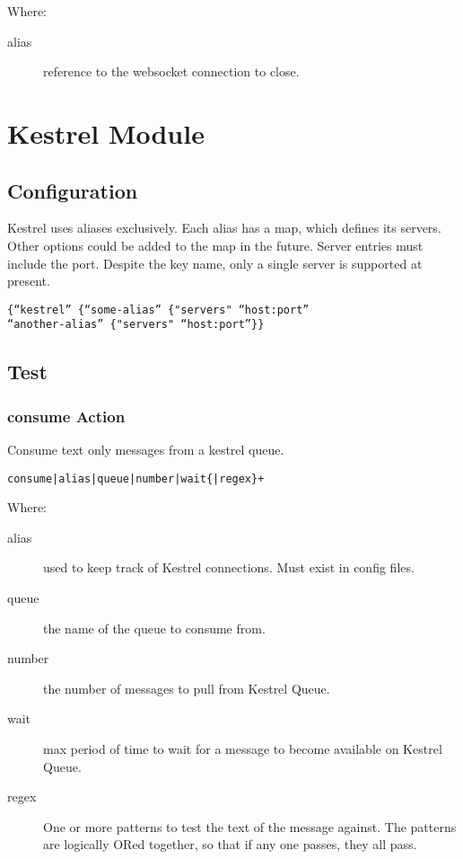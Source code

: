 \documentclass[12pt,a4paper,koma]{article}
\begin{document}
Where:
\begin{description}
\item[{alias}] reference to the websocket connection to close.
\end{description}

\section{Kestrel Module}
\label{sec-7}
\subsection{Configuration}
\label{sec-7-1}
Kestrel uses aliases exclusively. Each alias has a map, which defines
its servers. Other options could be added to the map in the
future. Server entries must include the port. Despite the key name,
only a single server is supported at present.
\begin{verbatim}
{“kestrel” {“some-alias” {"servers" “host:port”
“another-alias” {"servers" “host:port”}}
\end{verbatim}

\subsection{Test}
\label{sec-7-2}
\subsubsection{consume Action}
\label{sec-7-2-1}
Consume text only messages from a kestrel queue.
\begin{verbatim}
consume|alias|queue|number|wait{|regex}+
\end{verbatim}
Where:
\begin{description}
\item[{alias}] used to keep track of Kestrel connections. Must exist in
config files.
\item[{queue}] the name of the queue to consume from.
\item[{number}] the number of messages to pull from Kestrel Queue.
\item[{wait}] max period of time to wait for a message to become
available on Kestrel Queue.
\item[{regex}] One or more patterns to test the text of the message
against. The patterns are logically ORed together, so that
if any one passes, they all pass.
\end{description}
\end{document}
